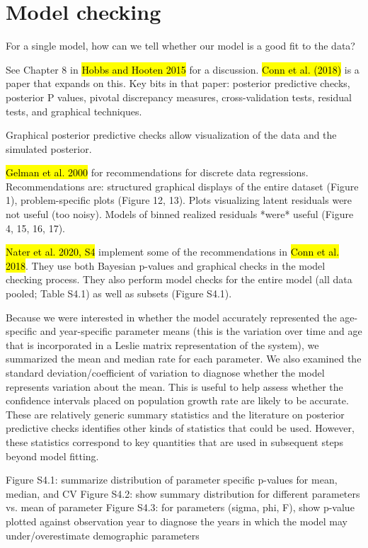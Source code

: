 \documentclass[12pt, oneside, titlepage]{article}   	%
\begin{document}
\section*{Model checking}

For a single model, how can we tell whether our model is a good fit to the data?

See Chapter 8 in \hl{Hobbs and Hooten 2015} for a discussion. \hl{Conn et al. (2018)} is a paper that expands on this. Key bits in that paper: posterior predictive checks, posterior P values, pivotal discrepancy measures, cross-validation tests, residual tests, and graphical techniques.

Graphical posterior predictive checks allow visualization of the data and the simulated posterior.

\hl{Gelman et al. 2000} for recommendations for discrete data regressions. Recommendations are: structured graphical displays of the entire dataset (Figure 1), problem-specific plots (Figure 12, 13). Plots visualizing latent residuals were not useful (too noisy). Models of binned realized residuals *were* useful (Figure 4, 15, 16, 17).

\hl{Nater et al. 2020, S4} implement some of the recommendations in \hl{Conn et al. 2018}. They use both Bayesian p-values and graphical checks in the model checking process. They also perform model checks for the entire model (all data pooled; Table S4.1) as well as subsets (Figure S4.1).

Because we were interested in whether the model accurately represented the age-specific and year-specific parameter means (this is the variation over time and age that is incorporated in a Leslie matrix representation of the system), we summarized the mean and median rate for each parameter. We also examined the standard deviation/coefficient of variation to diagnose whether the model represents variation about the mean. This is useful to help assess whether the confidence intervals placed on population growth rate are likely to be accurate. These are relatively generic summary statistics and the literature on posterior predictive checks identifies other kinds of statistics that could be used. However, these statistics correspond to key quantities that are used in subsequent steps beyond model fitting. 

Figure S4.1: summarize distribution of parameter specific p-values for mean, median, and CV
Figure S4.2: show summary distribution for different parameters vs. mean of parameter
Figure S4.3: for parameters (sigma, phi, F), show p-value plotted against observation year to diagnose the years in which the model may under/overestimate demographic parameters
\end{document}
